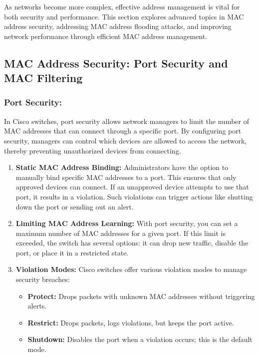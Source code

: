 \documentclass[11pt,a4paper]{article}
\begin{document}
As networks become more complex, effective address management is vital for both security and performance. This section explores advanced topics in MAC address security, addressing MAC address flooding attacks, and improving network performance through efficient MAC address management.

\subsection*{MAC Address Security: Port Security and MAC Filtering}
\subsubsection*{Port Security:}
In Cisco switches, port security allows network managers to limit the number of MAC addresses that can connect through a specific port. By configuring port security, managers can control which devices are allowed to access the network, thereby preventing unauthorized devices from connecting.

\begin{enumerate}
    \item \textbf{Static MAC Address Binding:} Administrators have the option to manually bind specific MAC addresses to a port. This ensures that only approved devices can connect. If an unapproved device attempts to use that port, it results in a violation. Such violations can trigger actions like shutting down the port or sending out an alert.
    \item \textbf{Limiting MAC Address Learning:} With port security, you can set a maximum number of MAC addresses for a given port. If this limit is exceeded, the switch has several options: it can drop new traffic, disable the port, or place it in a restricted state.
    \item \textbf{Violation Modes:} Cisco switches offer various violation modes to manage security breaches:
        \begin{itemize}
            \item \textbf{Protect:} Drops packets with unknown MAC addresses without triggering alerts.
            \item \textbf{Restrict:} Drops packets, logs violations, but keeps the port active.
            \item \textbf{Shutdown:} Disables the port when a violation occurs; this is the default mode.
        \end{itemize}
\end{enumerate}
\end{document}
